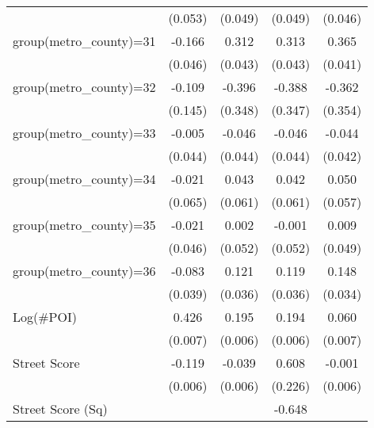 {\begin{tabular}{l*{4}{c}}
                    &     (0.053)         &     (0.049)         &     (0.049)         &     (0.046)         \\
group(metro\_county)=31&      -0.166\sym{***}&       0.312\sym{***}&       0.313\sym{***}&       0.365\sym{***}\\
                    &     (0.046)         &     (0.043)         &     (0.043)         &     (0.041)         \\
group(metro\_county)=32&      -0.109         &      -0.396         &      -0.388         &      -0.362         \\
                    &     (0.145)         &     (0.348)         &     (0.347)         &     (0.354)         \\
group(metro\_county)=33&      -0.005         &      -0.046         &      -0.046         &      -0.044         \\
                    &     (0.044)         &     (0.044)         &     (0.044)         &     (0.042)         \\
group(metro\_county)=34&      -0.021         &       0.043         &       0.042         &       0.050         \\
                    &     (0.065)         &     (0.061)         &     (0.061)         &     (0.057)         \\
group(metro\_county)=35&      -0.021         &       0.002         &      -0.001         &       0.009         \\
                    &     (0.046)         &     (0.052)         &     (0.052)         &     (0.049)         \\
group(metro\_county)=36&      -0.083\sym{**} &       0.121\sym{***}&       0.119\sym{***}&       0.148\sym{***}\\
                    &     (0.039)         &     (0.036)         &     (0.036)         &     (0.034)         \\
Log(\#POI)          &       0.426\sym{***}&       0.195\sym{***}&       0.194\sym{***}&       0.060\sym{***}\\
                    &     (0.007)         &     (0.006)         &     (0.006)         &     (0.007)         \\
Street Score        &      -0.119\sym{***}&      -0.039\sym{***}&       0.608\sym{**} &      -0.001         \\
                    &     (0.006)         &     (0.006)         &     (0.226)         &     (0.006)         \\
Street Score (Sq)   &                     &                     &      -0.648\sym{***}&                     \\

\end{tabular}}
